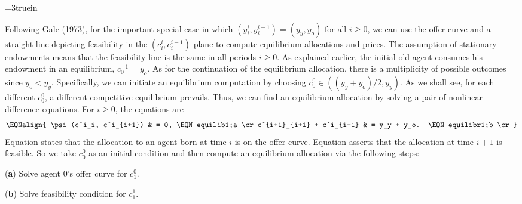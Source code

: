 
\centerline{\epsfxsize=3truein}
\caption{The offer curve and feasibility line.}
\endfigure

\medskip {}%
Following Gale (1973), for the important special case in which $(y_i^i, y_i^{i-1}) = (y_y, y_o)$ for all $i \geq 0$,
 we can use the offer curve and
a straight line depicting feasibility in the $(c^i_i, c^{i-1}_i)$ plane
to  compute equilibrium allocations and prices.  The assumption 
of stationary endowments
means that the feasibility line is the same in
all periods $i \geq 0$. As explained earlier, the initial 
old agent consumes his endowment in an equilibrium,
$c^{-1}_0 = y_o$. As for the continuation of the equilibrium 
allocation, there is a multiplicity of possible
outcomes since $y_o<y_y$. Specifically, we can initiate an
equilibrium computation by choosing
$c^0_0 \in ((y_y+y_o)/2,y_y)$.
As we shall see, for each  different $c_0^0$, a different  competitive equilibrium prevails.
Thus, we  can  find an equilibrium allocation by solving  a pair of nonlinear difference equations.
  For $i \geq 0$, the equations
are
$$\EQNalign{  \psi(c^i_i, c^i_{i+1}) & = 0, \EQN equilib1;a \cr
              c^{i+1}_{i+1} + c^i_{i+1} & = y_y + y_o. \EQN equilibr1;b \cr}$$
Equation  states that the allocation to an agent
born at time $i$ is on the offer curve. 
Equation 
asserts that the allocation at time $i+1$  is 
feasible.
So we take $c_0^0$ as an initial condition and then compute an equilibrium allocation via the following steps:


\medskip
\item{({\bf a})} Solve agent $0$'s offer curve   for $c^0_1$.

\medskip
\item{({\bf b})} Solve feasibility condition  for $c_1^1$.

